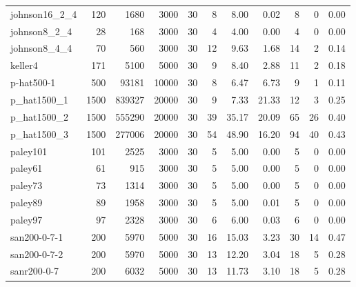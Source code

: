 \begin{tabular}{lrrrrrrrrrr}
johnson16\_2\_4 & 120 & 1680 & 3000 & 30 & 8 & 8.00 & 0.02 & 8 & 0 & 0.00 \\
johnson8\_2\_4 & 28 & 168 & 3000 & 30 & 4 & 4.00 & 0.00 & 4 & 0 & 0.00 \\
johnson8\_4\_4 & 70 & 560 & 3000 & 30 & 12 & 9.63 & 1.68 & 14 & 2 & 0.14 \\
keller4 & 171 & 5100 & 5000 & 30 & 9 & 8.40 & 2.88 & 11 & 2 & 0.18 \\
p-hat500-1 & 500 & 93181 & 10000 & 30 & 8 & 6.47 & 6.73 & 9 & 1 & 0.11 \\
p\_hat1500\_1 & 1500 & 839327 & 20000 & 30 & 9 & 7.33 & 21.33 & 12 & 3 & 0.25 \\
p\_hat1500\_2 & 1500 & 555290 & 20000 & 30 & 39 & 35.17 & 20.09 & 65 & 26 & 0.40 \\
p\_hat1500\_3 & 1500 & 277006 & 20000 & 30 & 54 & 48.90 & 16.20 & 94 & 40 & 0.43 \\
paley101 & 101 & 2525 & 3000 & 30 & 5 & 5.00 & 0.00 & 5 & 0 & 0.00 \\
paley61 & 61 & 915 & 3000 & 30 & 5 & 5.00 & 0.00 & 5 & 0 & 0.00 \\
paley73 & 73 & 1314 & 3000 & 30 & 5 & 5.00 & 0.00 & 5 & 0 & 0.00 \\
paley89 & 89 & 1958 & 3000 & 30 & 5 & 5.00 & 0.01 & 5 & 0 & 0.00 \\
paley97 & 97 & 2328 & 3000 & 30 & 6 & 6.00 & 0.03 & 6 & 0 & 0.00 \\
san200-0-7-1 & 200 & 5970 & 5000 & 30 & 16 & 15.03 & 3.23 & 30 & 14 & 0.47 \\
san200-0-7-2 & 200 & 5970 & 5000 & 30 & 13 & 12.20 & 3.04 & 18 & 5 & 0.28 \\
sanr200-0-7 & 200 & 6032 & 5000 & 30 & 13 & 11.73 & 3.10 & 18 & 5 & 0.28 \\
\bottomrule
\end{tabular}
